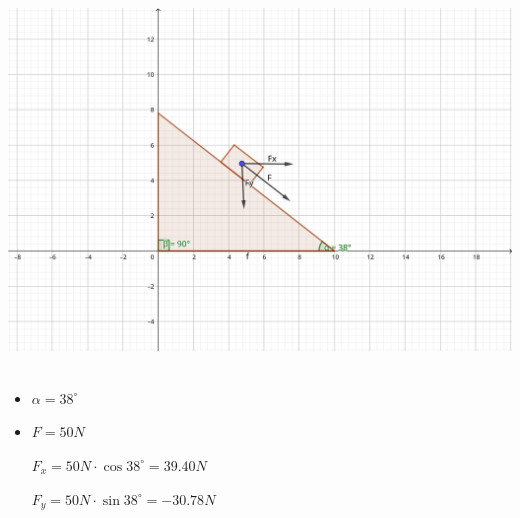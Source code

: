 \documentclass[../practica_01.tex]{subfiles}
\begin{document}
\includegraphics[scale=0.2]{ej03/resources/3.png} $ $

\begin{itemize}
    \item $\alpha = 38^{\circ}$

    \item $F = 50 N$
    
    $F_x = 50N \cdot \cos 38^{\circ} = 39.40N$

    $F_y = 50N \cdot \sin 38^{\circ} = -30.78N$
    
\end{itemize}
\end{document}
